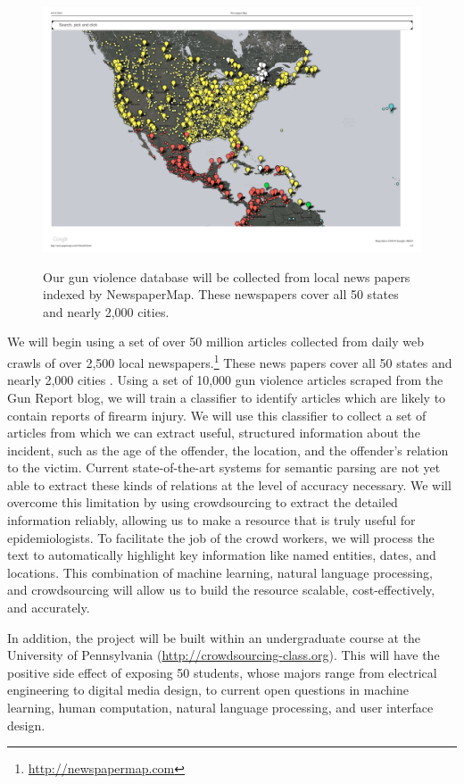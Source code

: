 \documentclass[11pt]{article}
\begin{document}
\begin{figure}
\includegraphics[width=\linewidth]{newspapermap.pdf}
\label{map}
\caption{Our gun violence database will be collected from local news papers indexed by NewspaperMap. These newspapers cover all 50 states and nearly 2,000 cities.}
\end{figure}

We will begin using a set of over 50 million articles collected from daily web crawls of over 2,500 local newspapers.\footnote{\url{http://newspapermap.com}} These news papers cover all 50 states and nearly 2,000 cities \cite{Irvine-EtAl-2014:LREC}. Using a set of 10,000 gun violence articles scraped from the Gun Report blog, we will train a classifier to identify articles which are likely to contain reports of firearm injury. We will use this classifier to collect a set of articles from which we can extract useful, structured information about the incident, such as the age of the offender, the location, and the offender's relation to the victim. Current state-of-the-art systems for semantic parsing are not yet able to extract these kinds of relations at the level of accuracy necessary. We will overcome this limitation by using crowdsourcing to extract the detailed information reliably, allowing us to make a resource that is truly useful for epidemiologists. To facilitate the job of the crowd workers, we will process the text to automatically highlight key information like named entities, dates, and locations. This combination of machine learning, natural language processing, and crowdsourcing will allow us to build the resource scalable, cost-effectively, and accurately.

In addition, the project will be built within an undergraduate course at the University of Pennsylvania (\url{http://crowdsourcing-class.org}). This will have the positive side effect of exposing 50 students, whose majors range from electrical engineering to digital media design, to current open questions in machine learning, human computation, natural language processing, and user interface design. 
\end{document}
